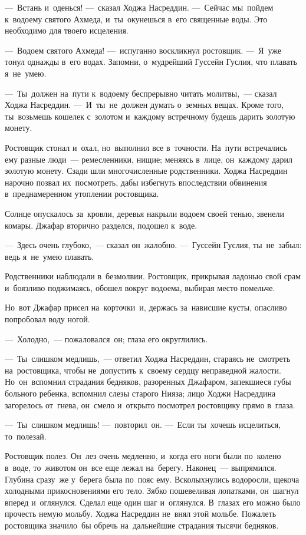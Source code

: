 \documentclass[12pt,a4paper]{book}
\begin{document}
—~Встань и~оденься! —~сказал Ходжа Насреддин. —~Сейчас мы~пойдем к~водоему святого Ахмеда, и~ты~окунешься в~его священные воды. Это необходимо для твоего исцеления.

—~Водоем святого Ахмеда! —~испуганно воскликнул ростовщик. —~Я~уже тонул однажды в~его водах. Запомни, о~мудрейший Гуссейн Гуслия, что плавать я~не~умею.

—~Ты~должен на~пути к~водоему беспрерывно читать молитвы,~— сказал Ходжа Насреддин. —~И~ты~не~должен думать о~земных вещах. Кроме того, ты~возьмешь кошелек с~золотом и~каждому встречному будешь дарить золотую монету.

Ростовщик стонал и~охал, но~выполнил все в~точности. На~пути встречались ему разные люди~— ремесленники, нищие; меняясь в~лице, он~каждому дарил золотую монету. Сзади шли многочисленные родственники. Ходжа Насреддин нарочно позвал их~посмотреть, дабы избегнуть впоследствии обвинения в~преднамеренном утоплении ростовщика.

Солнце опускалось за~кровли, деревья накрыли водоем своей тенью, звенели комары. Джафар вторично разделся, подошел к~воде.

—~Здесь очень глубоко,~— сказал он~жалобно. —~Гуссейн Гуслия, ты~не~забыл: ведь я~не~умею плавать.

Родственники наблюдали в~безмолвии. Ростовщик, прикрывая ладонью свой срам и~боязливо поджимаясь, обошел вокруг водоема, выбирая место помельче.

Но~вот Джафар присел на~корточки~и, держась за~нависшие кусты, опасливо попробовал воду ногой.

—~Холодно,~— пожаловался~он; глаза его округлились.

—~Ты~слишком медлишь,~— ответил Ходжа Насреддин, стараясь не~смотреть на~ростовщика, чтобы не~допустить к~своему сердцу неправедной жалости. Но~он~вспомнил страдания бедняков, разоренных Джафаром, запекшиеся губы больного ребенка, вспомнил слезы старого Нияза; лицо Ходжи Насреддина загорелось от~гнева, он~смело и~открыто посмотрел ростовщику прямо в~глаза.

—~Ты~слишком медлишь! —~повторил~он. —~Если ты~хочешь исцелиться, то~полезай.

Ростовщик полез. Он~лез очень медленно, и~когда его ноги были по~колено в~воде, то~животом он~все еще лежал на~берегу. Наконец~— выпрямился. Глубина сразу~же у~берега была по~пояс ему. Всколыхнулись водоросли, щекоча холодными прикосновениями его тело. Зябко пошевеливая лопатками, он~шагнул вперед и~оглянулся. Сделал еще один шаг и~оглянулся. В~глазах его можно было прочесть немую мольбу. Ходжа Насреддин не~внял этой мольбе. Пожалеть ростовщика значило~бы обречь на~дальнейшие страдания тысячи бедняков.
\end{document}
